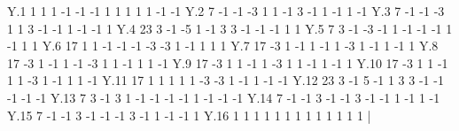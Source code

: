    Y.1         1     1     1   -1   -1   -1    1    1   1   1   1  -1  -1
    Y.2         7    -1    -1   -3    1    1   -1    3  -1   1  -1   1  -1
    Y.3         7    -1    -1   -3    1    1    3   -1  -1   1  -1  -1   1
    Y.4        23     3    -1   -5    1   -1    3    3  -1  -1  -1   1   1
    Y.5         7     3    -1   -3   -1    1   -1   -1  -1   1  -1   1   1
    Y.6        17     1     1   -1   -1   -1   -3   -3   1  -1   1   1   1
    Y.7        17    -3     1   -1    1   -1    1   -3   1  -1   1  -1   1
    Y.8        17    -3     1   -1    1   -1   -3    1   1  -1   1   1  -1
    Y.9        17    -3     1    1   -1    1   -3    1   1  -1   1  -1   1
    Y.10       17    -3     1    1   -1    1    1   -3   1  -1   1   1  -1
    Y.11       17     1     1    1    1    1   -3   -3   1  -1   1  -1  -1
    Y.12       23     3    -1    5   -1    1    3    3  -1  -1  -1  -1  -1
    Y.13        7     3    -1    3    1   -1   -1   -1  -1   1  -1  -1  -1
    Y.14        7    -1    -1    3   -1   -1    3   -1  -1   1  -1   1  -1
    Y.15        7    -1    -1    3   -1   -1   -1    3  -1   1  -1  -1   1
    Y.16        1     1     1    1    1    1    1    1   1   1   1   1   1
|



